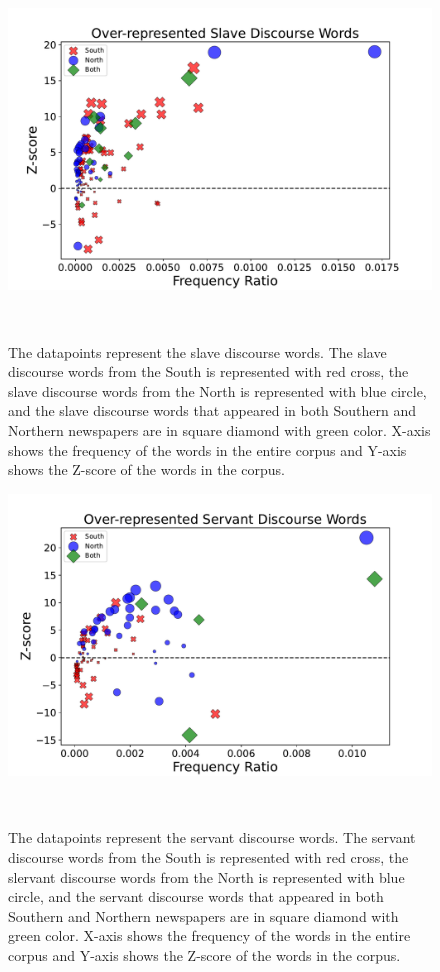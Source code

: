 \documentclass[11pt]{article}
\begin{document}
\begin{figure}[htb]%
  \centering
  \includegraphics[width=1\textwidth]{figure/slave-discourse.pdf}
    \caption{The datapoints represent the slave discourse words. The slave discourse words from the South is represented with red cross, the slave discourse words from the North is represented with blue circle, and the slave discourse words that appeared in both Southern and Northern newspapers are in square diamond with green color. X-axis shows the frequency of the words in the entire corpus
    and Y-axis shows the Z-score of the words in the corpus.
    }~\label{fig:slave-discourse}
    \vspace{-4mm}
  \end{figure}

  \begin{figure}[htb]%
    \centering
    \includegraphics[width=1\textwidth]{figure/servant-discourse.pdf}
    \caption{The datapoints represent the servant discourse words. The servant discourse words from the South is represented with red cross, the slervant discourse words from the North is represented with blue circle, and the servant discourse words that appeared in both Southern and Northern newspapers are in square diamond with green color. X-axis shows the frequency of the words in the entire corpus
    and Y-axis shows the Z-score of the words in the corpus.
    }~\label{fig:servant-discourse}
    \vspace{-4mm}
  \end{figure}
\end{document}
